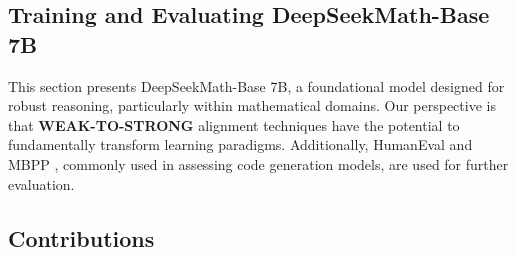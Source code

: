 \subsection{Training and Evaluating DeepSeekMath-Base 7B}

This section presents DeepSeekMath-Base 7B, a foundational model designed for robust reasoning, particularly within mathematical domains. Our perspective is that \textbf{WEAK-TO-STRONG} \citep{burns2023weak} alignment techniques have the potential to fundamentally transform learning paradigms. Additionally, HumanEval \citep{codex} and MBPP \citep{mbpp}, commonly used in assessing code generation models, are used for further evaluation. \subsection{Contributions}
